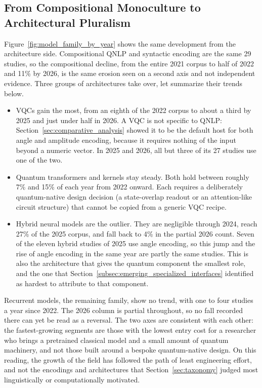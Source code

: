 \documentclass{ieeeaccess}
\begin{document}
\subsection{From Compositional Monoculture to Architectural Pluralism}
\label{subsec:temporal_model_family}

Figure~\ref{fig:model_family_by_year} shows the same development from the architecture side. Compositional QNLP and syntactic encoding are the same 29 studies, so the compositional decline, from the entire 2021 corpus to half of 2022 and 11\% by 2026, is the same erosion seen on a second axis and not independent evidence. Three groups of architectures take over, 
let summarize their trends below.  
\begin{itemize}
\item VQCs gain the most, from an eighth of the 2022 corpus to about a third by 2025 and just under half in 2026. A VQC is not specific to QNLP: Section~\ref{sec:comparative_analysis} showed it to be the default host for both angle and amplitude encoding, because it requires nothing of the input beyond a numeric vector. In 2025 and 2026, all but three of its 27 studies use one of the two.

\item Quantum transformers and kernels stay steady. Both hold between roughly 7\% and 15\% of each year from 2022 onward. Each requires a deliberately quantum-native design decision (a state-overlap readout or an attention-like circuit structure) that cannot be copied from a generic VQC recipe.

\item Hybrid neural models are the outlier. They are negligible through 2024, reach 27\% of the 2025 corpus, and fall back to 4\% in the partial 2026 count. Seven of the eleven hybrid studies of 2025 use angle encoding, so this jump and the rise of angle encoding in the same year are partly the same studies. This is also the architecture that gives the quantum component the smallest role, and the one that Section~\ref{subsec:emerging_specialized_interfaces} identified as hardest to attribute to that component.
\end{itemize}

Recurrent models, the remaining family, show no trend, with one to four studies a year since 2022. The 2026 column is partial throughout, so no fall recorded there can yet be read as a reversal. The two axes are consistent with each other: the fastest-growing segments are those with the lowest entry cost for a researcher who brings a pretrained classical model and a small amount of quantum machinery, and not those built around a bespoke quantum-native design. On this reading, the growth of the field has followed the path of least engineering effort, and not the encodings and architectures that Section~\ref{sec:taxonomy} judged most linguistically or computationally motivated.
\end{document}
